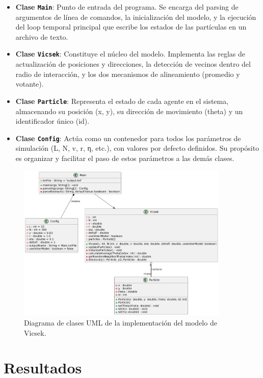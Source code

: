 \documentclass{article}
\begin{document}
\begin{itemize}
\item \textbf{Clase \texttt{Main}}: Punto de entrada del programa. Se encarga del parsing de argumentos de línea de comandos, la inicialización del modelo, y la ejecución del loop temporal principal que escribe los estados de las partículas en un archivo de texto.
\item \textbf{Clase \texttt{Vicsek}}: Constituye el núcleo del modelo. Implementa las reglas de actualización de posiciones y direcciones, la detección de vecinos dentro del radio de interacción, y los dos mecanismos de alineamiento (promedio y votante).
\item \textbf{Clase \texttt{Particle}}: Representa el estado de cada agente en el sistema, almacenando su posición (x, y), su dirección de movimiento (theta) y un identificador único (id).
\item \textbf{Clase \texttt{Config}}: Actúa como un contenedor para todos los parámetros de simulación (L, N, v, r, η, etc.), con valores por defecto definidos. Su propósito es organizar y facilitar el paso de estos parámetros a las demás clases.
\end{itemize}

\begin{figure}[H]
\centering
\includegraphics[width=0.9\textwidth]{TP2_UML.png}
\caption{Diagrama de clases UML de la implementación del modelo de Vicsek.}
\label{fig:uml}
\end{figure}

\section{Resultados}
\end{document}
